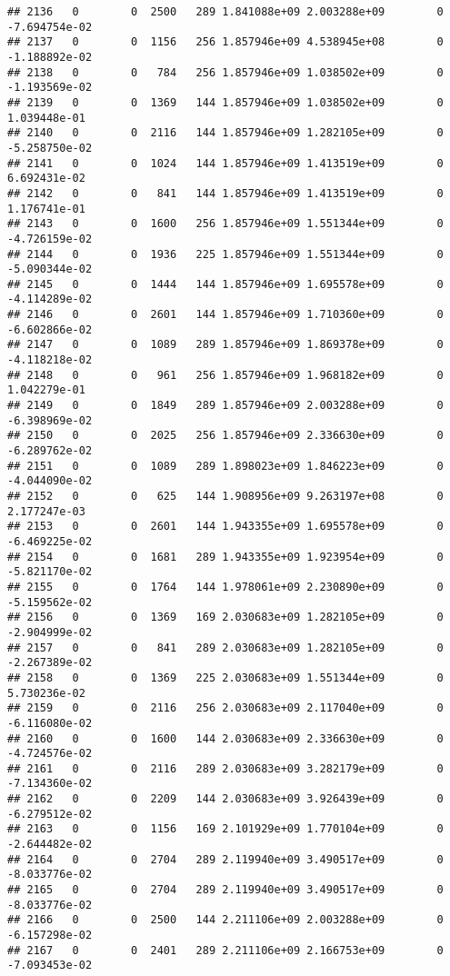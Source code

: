 \documentclass[
]{article}
\begin{document}
\begin{enumerate}
\begin{verbatim}
## 2136   0        0  2500   289 1.841088e+09 2.003288e+09        0 -7.694754e-02
## 2137   0        0  1156   256 1.857946e+09 4.538945e+08        0 -1.188892e-02
## 2138   0        0   784   256 1.857946e+09 1.038502e+09        0 -1.193569e-02
## 2139   0        0  1369   144 1.857946e+09 1.038502e+09        0  1.039448e-01
## 2140   0        0  2116   144 1.857946e+09 1.282105e+09        0 -5.258750e-02
## 2141   0        0  1024   144 1.857946e+09 1.413519e+09        0  6.692431e-02
## 2142   0        0   841   144 1.857946e+09 1.413519e+09        0  1.176741e-01
## 2143   0        0  1600   256 1.857946e+09 1.551344e+09        0 -4.726159e-02
## 2144   0        0  1936   225 1.857946e+09 1.551344e+09        0 -5.090344e-02
## 2145   0        0  1444   144 1.857946e+09 1.695578e+09        0 -4.114289e-02
## 2146   0        0  2601   144 1.857946e+09 1.710360e+09        0 -6.602866e-02
## 2147   0        0  1089   289 1.857946e+09 1.869378e+09        0 -4.118218e-02
## 2148   0        0   961   256 1.857946e+09 1.968182e+09        0  1.042279e-01
## 2149   0        0  1849   289 1.857946e+09 2.003288e+09        0 -6.398969e-02
## 2150   0        0  2025   256 1.857946e+09 2.336630e+09        0 -6.289762e-02
## 2151   0        0  1089   289 1.898023e+09 1.846223e+09        0 -4.044090e-02
## 2152   0        0   625   144 1.908956e+09 9.263197e+08        0  2.177247e-03
## 2153   0        0  2601   144 1.943355e+09 1.695578e+09        0 -6.469225e-02
## 2154   0        0  1681   289 1.943355e+09 1.923954e+09        0 -5.821170e-02
## 2155   0        0  1764   144 1.978061e+09 2.230890e+09        0 -5.159562e-02
## 2156   0        0  1369   169 2.030683e+09 1.282105e+09        0 -2.904999e-02
## 2157   0        0   841   289 2.030683e+09 1.282105e+09        0 -2.267389e-02
## 2158   0        0  1369   225 2.030683e+09 1.551344e+09        0  5.730236e-02
## 2159   0        0  2116   256 2.030683e+09 2.117040e+09        0 -6.116080e-02
## 2160   0        0  1600   144 2.030683e+09 2.336630e+09        0 -4.724576e-02
## 2161   0        0  2116   289 2.030683e+09 3.282179e+09        0 -7.134360e-02
## 2162   0        0  2209   144 2.030683e+09 3.926439e+09        0 -6.279512e-02
## 2163   0        0  1156   169 2.101929e+09 1.770104e+09        0 -2.644482e-02
## 2164   0        0  2704   289 2.119940e+09 3.490517e+09        0 -8.033776e-02
## 2165   0        0  2704   289 2.119940e+09 3.490517e+09        0 -8.033776e-02
## 2166   0        0  2500   144 2.211106e+09 2.003288e+09        0 -6.157298e-02
## 2167   0        0  2401   289 2.211106e+09 2.166753e+09        0 -7.093453e-02

\end{verbatim}
\end{enumerate}
\end{document}
